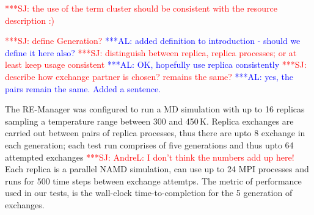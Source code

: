 \documentclass{rspublic}
\newcommand{\alnote}[1]{ {\textcolor{blue} { ***AL: #1 }}}
\newcommand{\jhanote}[1]{ {\textcolor{red} { ***SJ: #1 }}}
\newcommand{\alnote}[1]{}
\newcommand{\jhanote}[1]{}
\begin{document}
\jhanote{the use of the term cluster should be consistent with the
  resource description :)}


\jhanote{define Generation?}  \alnote{added definition to introduction
  - should we define it here also?}  \jhanote{distinguish between
  replica, replica processes; or at least keep usage consistent}
\alnote{OK, hopefully use replica consistently} \jhanote{describe how
  exchange partner is chosen? remains the same?}\alnote{yes, the pairs
  remain the same. Added a sentence.}



The RE-Manager was configured to run a MD simulation with up to 16
replicas sampling a temperature range between 300 and 450\,K. Replica
exchanges are carried out between pairs of replica processes, thus
there are upto 8 exchange in each generation; each test run comprises
of five generations and thus upto 64 attempted
exchanges\jhanote{AndreL: I don't think the numbers add up here!}
Each replica is a parallel NAMD simulation, can use up to 24 MPI
processes and runs for 500 time steps between exchange attemtps. The
metric of performance used in our tests, is the wall-clock
time-to-completion for the 5 generation of exchanges.
\end{document}
